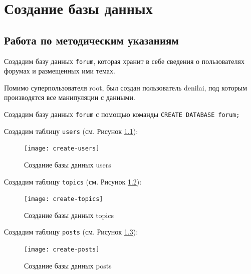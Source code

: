 \chapter{Создание базы данных}
\section{Работа по методическим указаниям}
Создадим базу данных \texttt{forum}, которая хранит в себе сведения о пользователях форумах и размещенных ими темах.

Помимо суперпользователя root, был создан пользователь denilai, под которым производятся все манипуляции с данными.

Создадим базу данных \texttt{forum} с помощью команды \texttt{CREATE DATABASE forum;}


Создадим таблицу \texttt{users} (см. Рисунок \ref{fig:create-users}):

\begin{figure}[h!]
	\centering
	\texttt{[image: create-users]}
	\caption{Создание базы данных users}
	\label{fig:create-users}
\end{figure}


Создадим таблицу \texttt{topics} (см. Рисунок \ref{fig:create-topics}):

\begin{figure}[h!]
	\centering
	\texttt{[image: create-topics]}
	\caption{Создание базы данных topics}
	\label{fig:create-topics}
\end{figure}

Создадим таблицу \texttt{posts} (см. Рисунок \ref{fig:create-posts}):

\begin{figure}[h!]
	\centering
	\texttt{[image: create-posts]}
	\caption{Создание базы данных posts}
	\label{fig:create-posts}
\end{figure}

